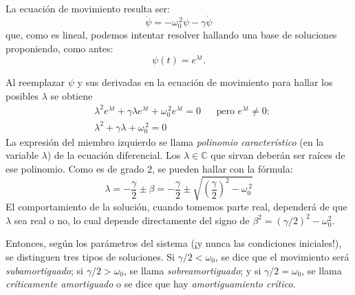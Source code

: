 \documentclass[a4paper,spanish]{article}
\def\C {\mathbb{C}}
\numberwithin{equation}{section}
\begin{document}
La ecuaci\'on de movimiento resulta ser:
		\begin{equation}
			\ddot{\psi} = - \omega_0^{\,2} \psi - \gamma \dot{\psi}
                        \label{eq:oscilador_amortiguado}
		\end{equation}
que, como es lineal, podemos intentar resolver hallando una base de soluciones proponiendo, como antes:
		\[\psi(t) = e^{\lambda t}.\]
		
Al reemplazar $\psi$ y sus derivadas en la ecuaci\'on de movimiento para hallar los posibles $\lambda$ se obtiene
		\begin{align*}
			&\lambda^2 e^{\lambda t} + \gamma\lambda e^{\lambda t} + \omega_0^{\,2} e^{\lambda t} = 0
			& & \text{pero }e^{\lambda t} \neq 0:\\
			&\lambda^2 + \gamma\lambda + \omega_0^{\,2}=0
		\end{align*}
La expresi\'on del miembro izquierdo se llama \textit{polinomio caracter\'istico} (en la variable $\lambda$) de la ecuaci\'on diferencial. Los $\lambda\in\C$ que sirvan deber\'an ser ra\'ices de ese polinomio. Como es de grado 2, se pueden hallar con la f\'ormula:
		\begin{equation}
			\lambda = -\frac{\gamma}{2} \pm \beta = -\frac{\gamma}{2} \pm \sqrt{\left(\frac{\gamma}{2}\right)^2 - \omega_0^{\,2}}
                      \label{eq:oscilador_amortiguado_raices}
		\end{equation}
El comportamiento de la soluci\'on, cuando tomemos parte real, depender\'a de que $\lambda$ sea real o no, lo cual depende directamente del signo de $\beta^2 = (\gamma/2)^2 - \omega_0^{2}$. 

Entonces, seg\'un los par\'ametros del sistema (¡y nunca las condiciones iniciales!), se distinguen tres tipos de soluciones. Si $\gamma/2<\omega_0$, se dice que el movimiento ser\'a \textit{subamortiguado}; si $\gamma/2>\omega_0$, se llama \textit{sobreamortiguado}; y si $\gamma/2=\omega_0$, se llama \textit{cr\'iticamente amortiguado} o se dice que hay \textit{amortiguamiento cr\'itico}.
		
    
\end{document}
